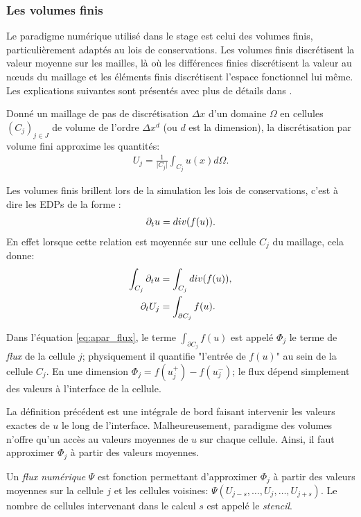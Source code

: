 \subsubsection{Les volumes finis}
Le paradigme numérique utilisé dans le stage est celui des volumes finis, particulièrement adaptés au lois de conservations.
Les volumes finis discrétisent la valeur moyenne sur les mailles, là où les différences finies discrétisent la valeur au nœuds du maillage et 
les éléments finis discrétisent l'espace fonctionnel lui même. Les explications suivantes sont présentés avec plus de détails dans \cite{LeVeque1990}.
\begin{definition}
    Donné un maillage de pas de discrétisation $\Delta x$ d'un domaine $\Omega$ en cellules $(C_j)_{j\in J}$ de volume de l'ordre $\Delta x^d$ (ou $d$ est la dimension), 
    la discrétisation par volume fini approxime les quantités:
    \begin{align}
        U_j = \frac{1}{\vert C_j \vert} \int_{C_j} u(x) d\Omega.
    \end{align}
\end{definition}
Les volumes finis brillent lors de la simulation les lois de conservations, c'est à dire les EDPs de la forme :
\begin{align}
    \partial_t u = div(f(u)).
\end{align}
En effet lorsque cette relation est moyennée sur une cellule $C_j$ du maillage, cela donne: 
\begin{align}
    \int_{C_j} \partial_t u&= \int_{C_j}  div(f(u)),\\
    \partial_t U_j &= \int_{\partial C_j} f(u).\label{eq:apar_flux}
\end{align}
\begin{definition}
    Dans l'équation \ref{eq:apar_flux}, le terme $\int_{\partial C_j} f(u)$ est appelé $\Phi_j$ le terme de \textit{flux} de la cellule $j$;
    physiquement il quantifie "l'entrée de $f(u)$" au sein de la cellule $C_j$. En une dimension $\Phi_j = f(u^+_j) - f(u^-_j)$;
    le flux dépend simplement des valeurs à l'interface de la cellule.
\end{definition}
La définition précédent est une intégrale de bord faisant intervenir les valeurs exactes de $u$ le long de l'interface.
Malheureusement, paradigme des volumes n'offre qu'un accès au valeurs moyennes de $u$ sur chaque cellule.
Ainsi, il faut approximer $\Phi_j$ à partir des valeurs moyennes.
\begin{definition}
    Un \textit{flux numérique} $\Psi$ est fonction permettant d’approximer $\Phi_j$ à partir des valeurs moyennes sur la cellule $j$ et les cellules voisines:
    $\Psi(U_{j-s} , \ldots , U_j ,\ldots , U_{j+s})$. Le nombre de cellules intervenant dans le calcul $s$ est appelé le \textit{stencil}.
\end{definition}

